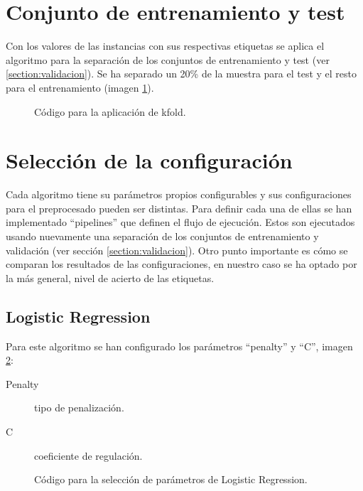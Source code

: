 \section{Conjunto de entrenamiento y test}
Con los valores de las instancias con sus respectivas etiquetas se aplica el algoritmo para la separación de los conjuntos de entrenamiento y test (ver \ref{section:validacion}). Se ha separado un 20\% de la muestra para el test y el resto para el entrenamiento (imagen \ref{figure:traintest}).

\begin{figure}[H]
\centering
{}
\caption{Código para la aplicación de \gls{kfold}.}
\label{figure:traintest}
\end{figure}

\section{Selección de la configuración}
Cada algoritmo tiene su parámetros propios configurables y sus configuraciones para el preprocesado pueden ser distintas. Para definir cada una de ellas se han implementado ``pipelines'' que definen el flujo de ejecución. Estos son ejecutados usando nuevamente una separación de los conjuntos de entrenamiento y validación (ver sección \ref{section:validacion}). Otro punto importante es cómo se comparan los resultados de las configuraciones, en nuestro caso se ha optado por la más general, nivel de acierto de las etiquetas.

\subsection{Logistic Regression}
Para este algoritmo se han configurado los parámetros ``penalty'' y ``C'', imagen \ref{figure:paramlog}:
\begin{description}
    \item [Penalty]  tipo de penalización.
    \item [C] coeficiente de regulación.
\end{description}

\begin{figure}[H]
\centering
{}
\caption{Código para la selección de parámetros de Logistic Regression.}
\label{figure:paramlog}
\end{figure}

